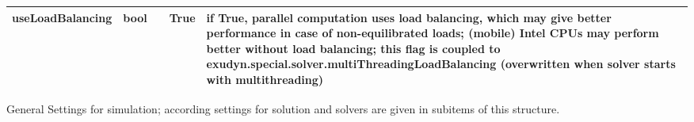 \begin{center}
\begin{longtable}{| p{4.2cm} | p{2.5cm} | p{0.3cm} | p{3.0cm} | p{6cm} |}
    useLoadBalancing &     bool &      &     True &     if True, parallel computation uses load balancing, which may give better performance in case of non-equilibrated loads; (mobile) Intel CPUs may perform better without load balancing; this flag is coupled to exudyn.special.solver.multiThreadingLoadBalancing (overwritten when solver starts with multithreading)\\ \hline
	  \end{longtable}
	\end{center}



\label{sec:SimulationSettings}
General Settings for simulation; according settings for solution and solvers are given in subitems of this structure. 

